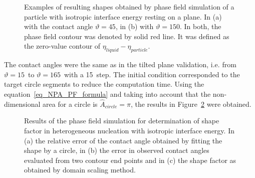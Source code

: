 	\begin{figure}
		\centering
		\caption[Results - simulated shapes in isotropic particle on a plane]{Examples of resulting shapes obtained by phase field simulation of a particle with isotropic interface energy resting on a plane. In (a) with the contact angle $\vartheta = 45$\textdegree, in (b) with $\vartheta = 150$\textdegree. In both, the phase field contour was denoted by solid red line. It was defined as the zero-value contour of $\eta_{liquid}-\eta_{particle}$.}
		\label{fig_result_NPA_PF_simulated_shapes}
	\end{figure}
	
	The contact angles were the same as in the tilted plane validation, i.e. from $\vartheta=15$\textdegree~to $\vartheta=165$\textdegree~with a 15\textdegree~step. The initial condition corresponded to the target circle segments to reduce the computation time. Using the equation~\eqref{eq_NPA_PF_formula} and taking into account that the non-dimensional area for a circle is $\hat{A}_{circle}=\pi$, the results in Figure~\ref{fig_result_NPA_PF_S_iso} were obtained.
	\begin{figure}
		\centering
		\caption[Results - shape factor for isotropic particle determined by domain scaling]{Results of the phase field simulation for determination of shape factor in heterogeneous nucleation with isotropic interface energy. In (a) the relative error of the contact angle obtained by fitting the shape by a circle, in (b) the error in observed contact angles evaluated from two contour end points and in (c) the shape factor as obtained by domain scaling method.}
		\label{fig_result_NPA_PF_S_iso}
	\end{figure}
	
